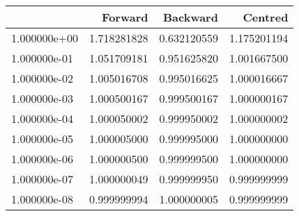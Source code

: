 \begin{table}
\centering
\label{Table 2.1, Bodenheimer, Repeated}
\begin{tabular}{lrrr}
\toprule
{} &     Forward &    Backward &     Centred \\
\midrule
1.000000e+00 & 1.718281828 & 0.632120559 & 1.175201194 \\
1.000000e-01 & 1.051709181 & 0.951625820 & 1.001667500 \\
1.000000e-02 & 1.005016708 & 0.995016625 & 1.000016667 \\
1.000000e-03 & 1.000500167 & 0.999500167 & 1.000000167 \\
1.000000e-04 & 1.000050002 & 0.999950002 & 1.000000002 \\
1.000000e-05 & 1.000005000 & 0.999995000 & 1.000000000 \\
1.000000e-06 & 1.000000500 & 0.999999500 & 1.000000000 \\
1.000000e-07 & 1.000000049 & 0.999999950 & 0.999999999 \\
1.000000e-08 & 0.999999994 & 1.000000005 & 0.999999999 \\
\bottomrule
\end{tabular}
\end{table}
